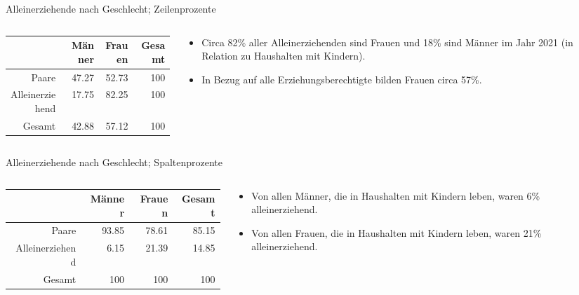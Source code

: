 \documentclass[18pt,handout, aspectratio=169]{beamer}
\begin{document}
\begin{frame}{Alleinerziehende nach Geschlecht; Zeilenprozente}
\begin{columns}

\begin{column}{.5\linewidth}
\begin{tabular}{rrrr} \toprule
      & Männer & Frauen & Gesamt\\ \midrule      
Paare & 47.27 & 52.73 & 100  \\
Alleinerziehend & 17.75 & 82.25 & 100 \\  \midrule
Gesamt & 42.88 & 57.12 & 100 \\ \bottomrule
\end{tabular}

\end{column}

\begin{column}{.5\linewidth}
\begin{itemize}
  \item Circa 82\% aller Alleinerziehenden sind Frauen und 18\% sind Männer im Jahr 2021 (in Relation zu Haushalten mit Kindern). 
  \item In Bezug auf alle Erziehungsberechtigte bilden Frauen circa 57\%. 
\end{itemize}
\end{column}

\end{columns}
\end{frame}


\begin{frame}{Alleinerziehende nach Geschlecht; Spaltenprozente}
\begin{columns}

\begin{column}{.5\linewidth}
\begin{tabular}{rrrr} \toprule
      & Männer & Frauen & Gesamt\\ \midrule      
Paare & 93.85 & 78.61 &  85.15   \\
Alleinerziehend & 6.15 & 21.39 & 14.85 \\  \midrule
Gesamt & 100 & 100 & 100  \\ \bottomrule
\end{tabular}


\end{column}

\begin{column}{.5\linewidth}
\begin{itemize}
  \item Von allen Männer, die in Haushalten mit Kindern leben, waren 6\% alleinerziehend. 
  \item Von allen Frauen, die in Haushalten mit Kindern leben, waren 21\% alleinerziehend. 
\end{itemize}
\end{column}

\end{columns}
\end{frame}
\end{document}
